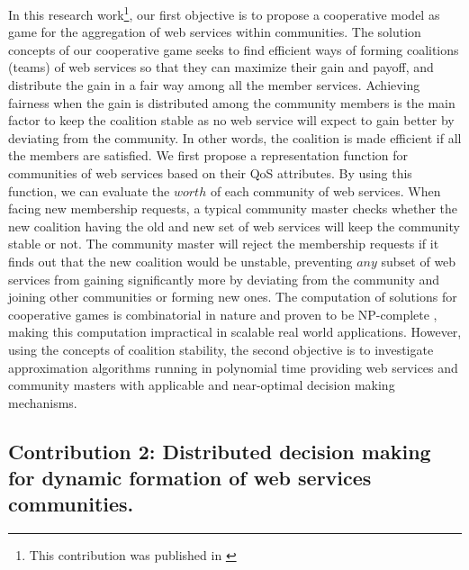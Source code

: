 In this research work\footnote{This contribution was published in \cite{10.1109/TSC.2014.2312940}}, our first objective is to propose a
cooperative model as game for the aggregation of web services
within communities. The solution concepts of our cooperative game
seeks to find efficient ways of forming coalitions (teams) of web
services so that they can maximize their gain and payoff, and
distribute the gain in a fair way among all the member services.
Achieving fairness when the gain is distributed among the
community members is the main factor to keep the coalition stable
as no web service will expect to gain better by deviating from the
community. In other words, the coalition is made efficient if all
the members are satisfied. We first propose a representation
function for communities of web services based on their QoS
attributes. By using this function, we can evaluate the $worth$ of
each community of web services. When facing new membership
requests, a typical community master checks whether the new
coalition having the old and new set of web services will keep the
community stable or not. The community master will reject the
membership requests if it finds out that the new coalition would
be unstable, preventing $any$ subset of web services from gaining
significantly more by deviating from the community and joining
other communities or forming new ones. The computation of
solutions for cooperative games is combinatorial in nature and
proven to be NP-complete \cite{Algorithmic}, making this
computation impractical in scalable real world applications. However, using
the concepts of coalition stability, the second objective is to
investigate approximation algorithms running in polynomial time
providing web services and community masters with applicable and
near-optimal decision making mechanisms.


\subsection{Contribution 2: Distributed decision making for dynamic formation of web services communities.}

